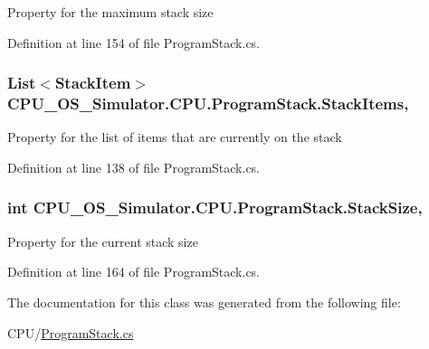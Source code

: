 Property for the maximum stack size 



Definition at line 154 of file Program\+Stack.\+cs.

\hypertarget{class_c_p_u___o_s___simulator_1_1_c_p_u_1_1_program_stack_a13eb0a485bbcdba8a38bbf80e78692c7}{}
\subsubsection[{Stack\+Items}]{\setlength{\rightskip}{0pt plus 5cm}List$<${\bf Stack\+Item}$>$ C\+P\+U\+\_\+\+O\+S\+\_\+\+Simulator.\+C\+P\+U.\+Program\+Stack.\+Stack\+Items\hspace{0.3cm}{\ttfamily [get]}, {\ttfamily [set]}}\label{class_c_p_u___o_s___simulator_1_1_c_p_u_1_1_program_stack_a13eb0a485bbcdba8a38bbf80e78692c7}


Property for the list of items that are currently on the stack 



Definition at line 138 of file Program\+Stack.\+cs.

\hypertarget{class_c_p_u___o_s___simulator_1_1_c_p_u_1_1_program_stack_ac9cedcbfdf26ffa757042280f21da367}{}
\subsubsection[{Stack\+Size}]{\setlength{\rightskip}{0pt plus 5cm}int C\+P\+U\+\_\+\+O\+S\+\_\+\+Simulator.\+C\+P\+U.\+Program\+Stack.\+Stack\+Size\hspace{0.3cm}{\ttfamily [get]}, {\ttfamily [set]}}\label{class_c_p_u___o_s___simulator_1_1_c_p_u_1_1_program_stack_ac9cedcbfdf26ffa757042280f21da367}


Property for the current stack size 



Definition at line 164 of file Program\+Stack.\+cs.



The documentation for this class was generated from the following file\+:\begin{DoxyCompactItemize}
\item 
C\+P\+U/\hyperlink{_program_stack_8cs}{Program\+Stack.\+cs}\end{DoxyCompactItemize}
